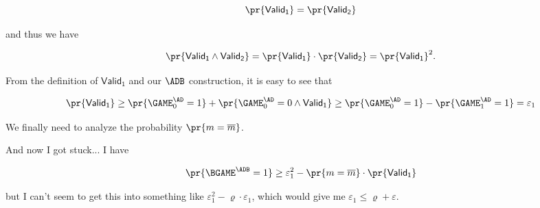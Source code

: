 \documentclass{crypto-exercise}
\newcommand{\Vone}{\mathsf{Valid_1}}
\newcommand{\Vtwo}{\mathsf{Valid_2}}
\begin{document}
\begin{solution}
\[\pr{\Vone} = \pr{\Vtwo}\]

and thus we have

\[\pr{\Vone \wedge \Vtwo} = \pr{\Vone} \cdot \pr{\Vtwo} = \pr{\Vone}^2 .\]

From the definition of $\Vone$ and our $\ADB$ construction, it is easy to see that

\[\pr{\Vone} \geq \pr{\GAME_0^\AD=1} + \pr{\GAME_0^\AD=0 \wedge \Vone} \geq  \pr{\GAME_0^\AD=1} - \pr{\GAME_1^\AD=1} = \varepsilon_1\]

We finally need to analyze the probability $\pr{m = \overline{m}}$.

And now I got stuck... I have 

\[\pr{\BGAME^{\ADB} = 1} \geq \varepsilon_1^2 - \pr{m = \overline{m}}\cdot\pr{\Vone} \]

but I can't seem to get this into something like $\varepsilon_1^2 - \varrho\cdot\varepsilon_1$, which would give me $\varepsilon_1 \leq \varrho + \varepsilon$.


\end{solution}
\end{document}
